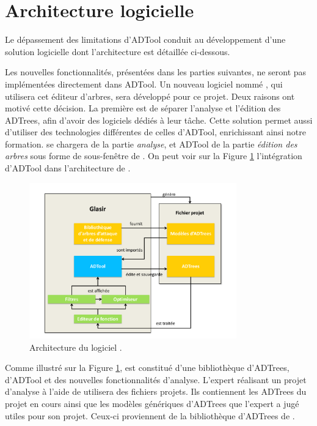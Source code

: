 \section{Architecture logicielle}
	\label{section:archi}

Le dépassement des limitations d'ADTool conduit au développement d'une solution logicielle dont l'architecture est détaillée ci-dessous.

Les nouvelles fonctionnalités, présentées dans les parties suivantes, ne seront pas implémentées directement dans ADTool. Un nouveau logiciel nommé \glasir{}, qui utilisera cet éditeur d'arbres, sera développé pour ce projet. Deux raisons ont motivé cette décision. 
La première est de séparer l'analyse et l'édition des ADTrees, afin d'avoir des logiciels dédiés à leur tâche. Cette solution permet aussi d'utiliser des technologies différentes de celles d'ADTool, enrichissant ainsi notre formation. \glasir{} se chargera de la partie \textit{analyse}, et ADTool de la partie \textit{édition des arbres} sous forme de sous-fenêtre de \glasir{}. On peut voir sur la {\sc Figure} \ref{fig:architecture_Glasir} l'intégration d'ADTool dans l'architecture de \glasir{}.

	\begin{figure}[h!]
		\centering
			\includegraphics[width=0.8\textwidth]{figure/archiGlasir.pdf}
		\caption{Architecture du logiciel \glasir{}.}
		\label{fig:architecture_Glasir}
	\end{figure}

Comme illustré sur la {\sc Figure} \ref{fig:architecture_Glasir}, \glasir{} est constitué d'une bibliothèque d'ADTrees, d'ADTool et des nouvelles fonctionnalités d'analyse. L'expert réalisant un projet d'analyse à l'aide de \glasir{} utilisera des fichiers projets. Ils contiennent les ADTrees du projet en cours ainsi que les modèles génériques d'ADTrees que l'expert a jugé utiles pour son projet. Ceux-ci proviennent de la bibliothèque d'ADTrees de \glasir{}.
	
